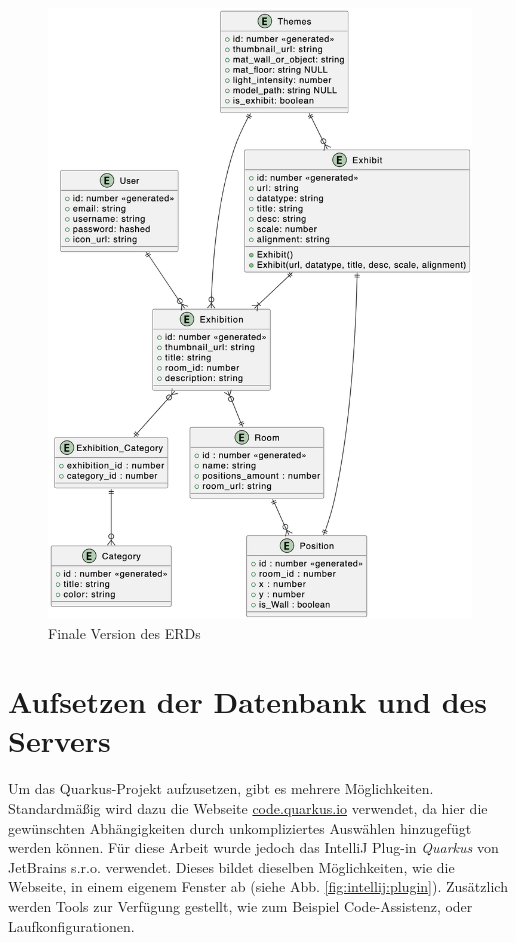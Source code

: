 \begin{figure}
    \centering
    \includegraphics[scale=0.5]{pics/lastversion_erd.png}
    \caption{Finale Version des ERDs}
    \label{fig:erd:lastversion}
\end{figure}

\section{Aufsetzen der Datenbank und des Servers}
Um das Quarkus-Projekt aufzusetzen, gibt es mehrere Möglichkeiten. 
Standardmäßig wird dazu die Webseite \href{https://code.quarkus.io}{code.quarkus.io} verwendet, da hier die gewünschten Abhängigkeiten durch unkompliziertes Auswählen hinzugefügt werden können. 
Für diese Arbeit wurde jedoch das IntelliJ Plug-in \emph{Quarkus} von JetBrains s.r.o. verwendet. 
Dieses bildet dieselben Möglichkeiten, wie die Webseite, in einem eigenem Fenster ab (siehe Abb. \ref{fig:intellij:plugin}).
Zusätzlich werden Tools zur Verfügung gestellt, wie zum Beispiel Code-Assistenz, oder Laufkonfigurationen. \cite{QuarkusPlugin}

